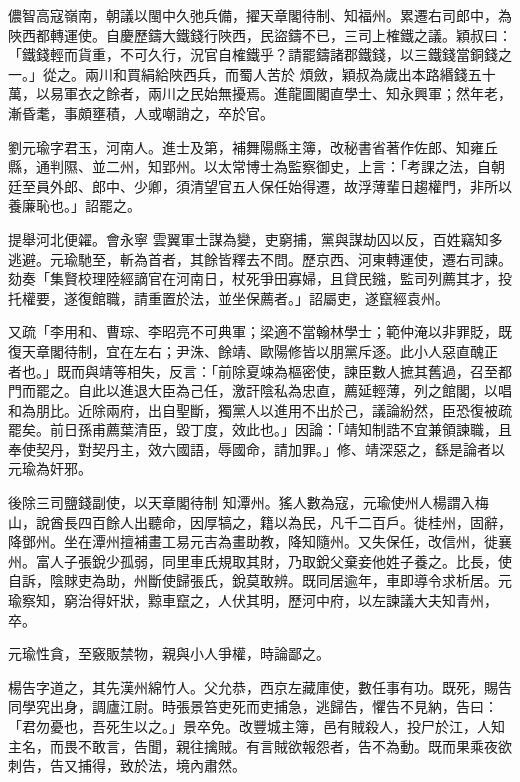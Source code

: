\begin{pinyinscope}
 儂智高寇嶺南，朝議以閩中久弛兵備，擢天章閣待制、知福州。累遷右司郎中，為陜西都轉運使。自慶歷鑄大鐵錢行陜西，民盜鑄不已，三司上榷鐵之議。穎叔曰：「鐵錢輕而貨重，不可久行，況官自榷鐵乎？請罷鑄諸郡鐵錢，以三鐵錢當銅錢之一。」從之。兩川和買絹給陜西兵，而蜀人苦於
 煩斂，穎叔為歲出本路緡錢五十萬，以易軍衣之餘者，兩川之民始無擾焉。進龍圖閣直學士、知永興軍；然年老，漸昏耄，事頗壅積，人或嘲誚之，卒於官。



 劉元瑜字君玉，河南人。進士及第，補舞陽縣主簿，改秘書省著作佐郎、知雍丘縣，通判隰、並二州，知郢州。以太常博士為監察御史，上言：「考課之法，自朝廷至員外郎、郎中、少卿，須清望官五人保任始得遷，故浮薄輩日趨權門，非所以養廉恥也。」詔罷之。



 提舉河北便糴。會永寧
 雲翼軍士謀為變，吏窮捕，黨與謀劫囚以反，百姓竊知多逃避。元瑜馳至，斬為首者，其餘皆釋去不問。歷京西、河東轉運使，遷右司諫。劾奏「集賢校理陸經謫官在河南日，杖死爭田寡婦，且貸民鏹，監司列薦其才，投托權要，遂復館職，請重置於法，並坐保薦者。」詔屬吏，遂竄經袁州。



 又疏「李用和、曹琮、李昭亮不可典軍；梁適不當翰林學士；範仲淹以非罪貶，既復天章閣待制，宜在左右；尹洙、餘靖、歐陽修皆以朋黨斥逐。此小人惡直醜正
 者也。」既而與靖等相失，反言：「前除夏竦為樞密使，諫臣數人摭其舊過，召至都門而罷之。自此以進退大臣為己任，激訐陰私為忠直，薦延輕薄，列之館閣，以唱和為朋比。近除兩府，出自聖斷，獨黨人以進用不出於己，議論紛然，臣恐復被疏罷矣。前日孫甫薦葉清臣，毀丁度，效此也。」因論：「靖知制誥不宜兼領諫職，且奉使契丹，對契丹主，效六國語，辱國命，請加罪。」修、靖深惡之，繇是論者以元瑜為奸邪。



 後除三司鹽錢副使，以天章閣待制
 知潭州。猺人數為寇，元瑜使州人楊謂入梅山，說酋長四百餘人出聽命，因厚犒之，籍以為民，凡千二百戶。徙桂州，固辭，降鄧州。坐在潭州擅補畫工易元吉為畫助教，降知隨州。又失保任，改信州，徙襄州。富人子張銳少孤弱，同里車氏規取其財，乃取銳父棄妾他姓子養之。比長，使自訴，陰賕吏為助，州斷使歸張氏，銳莫敢辨。既同居逾年，車即導令求析居。元瑜察知，窮治得奸狀，黥車竄之，人伏其明，歷河中府，以左諫議大夫知青州，卒。



 元瑜性貪，至竅販禁物，親與小人爭權，時論鄙之。



 楊告字道之，其先漢州綿竹人。父允恭，西京左藏庫使，數任事有功。既死，賜告同學究出身，調廬江尉。時張景笞吏死而吏捕急，逃歸告，懼告不見納，告曰：「君勿憂也，吾死生以之。」景卒免。改豐城主簿，邑有賊殺人，投尸於江，人知主名，而畏不敢言，告聞，親往擒賊。有言賊欲報怨者，告不為動。既而果乘夜欲刺告，告又捕得，致於法，境內肅然。




\end{pinyinscope}
